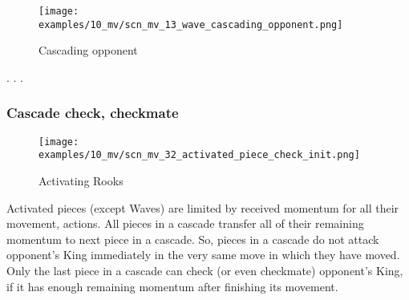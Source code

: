 \vspace*{-1.4\baselineskip}
\noindent
\begin{figure}[h]
\texttt{[image: examples/10\_mv/scn\_mv\_13\_wave\_cascading\_opponent.png]}
\caption{Cascading opponent}
\label{fig:scn_mv_13_wave_cascading_opponent}
\end{figure}

. . .





\clearpage %

\subsubsection*{Cascade check, checkmate}

\vspace*{-1.4\baselineskip}
\noindent
\begin{figure}[!h]
\texttt{[image: examples/10\_mv/scn\_mv\_32\_activated\_piece\_check\_init.png]}
\vspace*{-1.3\baselineskip}
\caption{Activating Rooks}
\label{fig:scn_mv_32_activated_piece_check_init}
\end{figure}

\vspace*{-0.3\baselineskip}
Activated pieces (except Waves) are limited by received momentum for all their movement,
actions. All pieces in a cascade transfer all of their remaining momentum to next piece
in a cascade. So, pieces in a cascade do not attack opponent's King immediately in the
very same move in which they have moved. Only the last piece in a cascade can check (or
even checkmate) opponent's King, if it has enough remaining momentum after finishing its
movement.

